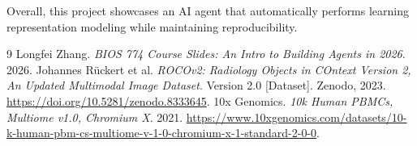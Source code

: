 \documentclass[10pt]{article}
\begin{document}
Overall, this project showcases an AI agent that automatically performs learning representation modeling while maintaining reproducibility.


\begin{thebibliography}{9}
 Longfei Zhang. \textit{BIOS 774 Course Slides: An Intro to Building Agents in 2026}. 2026.
 Johannes Rückert et al. \textit{ROCOv2: Radiology Objects in COntext Version 2, An Updated Multimodal Image Dataset}. Version 2.0 [Dataset]. Zenodo, 2023. \url{https://doi.org/10.5281/zenodo.8333645}.
 10x Genomics. \textit{10k Human PBMCs, Multiome v1.0, Chromium X}. 2021. \url{https://www.10xgenomics.com/datasets/10-k-human-pbm-cs-multiome-v-1-0-chromium-x-1-standard-2-0-0}.
\end{thebibliography}
\end{document}
